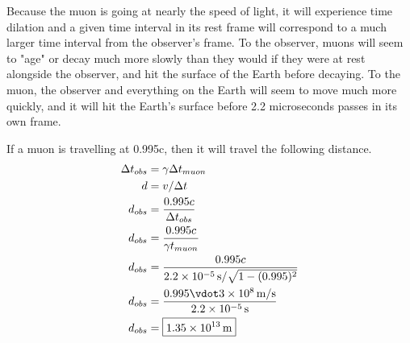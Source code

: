 \documentclass{homework}
\begin{document}
\maketitle


\question
Because the muon is going at nearly the speed of light, it will experience time dilation and a given time interval in its rest frame will correspond to a much larger time interval from the observer's frame. To the observer, muons will seem to "age" or decay much more slowly than they would if they were at rest alongside the observer, and hit the surface of the Earth before decaying. To the muon, the observer and everything on the Earth will seem to move much more quickly, and it will hit the Earth's surface before 2.2 microseconds passes in its own frame.

If a muon is travelling at 0.995c, then it will travel the following distance.
\begin{align*}
    \Delta t_{obs}	&=	\gamma \Delta t_{muon}	\\
    d    &=	v/\Delta t	\\
    d_{obs} &=  \frac{0.995c}{\Delta t_{obs}}   \\
    d_{obs} &=  \frac{0.995c}{\gamma t_{muon}}   \\
    d_{obs} &=  \frac{0.995c}{\SI{2.2e-5}{\second} / \sqrt{1-(0.995)^2}}   \\
    d_{obs} &=  \frac{0.995 \vdot \SI{3e8}{\metre/\second}}{\SI{2.2e-5}{\second}}   \\
    d_{obs} &=  \boxed{\SI{1.35e13}{\metre}}   \\
\end{align*}
\end{document}
